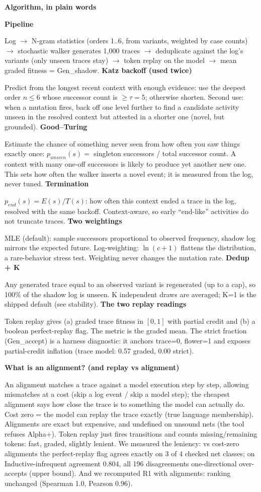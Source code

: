 \documentclass[10pt]{article}
\newcommand{\hdr}[1]{\vspace{5pt}\noindent\textcolor{hd}{\textbf{\large #1}}\par\vspace{2pt}}
\newcommand{\sub}[1]{\vspace{3pt}\noindent\textbf{#1}\par}
\begin{document}
\hdr{Algorithm, in plain words}
\sub{Pipeline}
Log $\to$ N-gram statistics (orders 1..6, from variants, weighted by case counts) $\to$ stochastic walker generates 1{,}000 traces $\to$ deduplicate against the log's variants (only unseen traces stay) $\to$ token replay on the model $\to$ mean graded fitness = Gen\_shadow.
\sub{Katz backoff (used twice)}
Predict from the longest recent context with enough evidence: use the deepest order $n\le6$ whose successor count is $\ge\tau{=}5$; otherwise shorten. Second use: when a mutation fires, back off one level further to find a candidate activity unseen in the resolved context but attested in a shorter one (novel, but grounded).
\sub{Good--Turing}
Estimate the chance of something never seen from how often you saw things exactly once: $p_{unseen}(s)=$ singleton successors / total successor count. A context with many one-off successors is likely to produce yet another new one. This sets how often the walker inserts a novel event; it is measured from the log, never tuned.
\sub{Termination}
$p_{end}(s)=E(s)/T(s)$: how often this context ended a trace in the log, resolved with the same backoff. Context-aware, so early ``end-like'' activities do not truncate traces.
\sub{Two weightings}
MLE (default): sample successors proportional to observed frequency, shadow log mirrors the expected future. Log-weighting: $\ln(c{+}1)$ flattens the distribution, a rare-behavior stress test. Weighting never changes the mutation rate.
\sub{Dedup + K}
Any generated trace equal to an observed variant is regenerated (up to a cap), so 100\% of the shadow log is unseen. K independent draws are averaged; K=1 is the shipped default (see stability).
\sub{The two replay readings}
Token replay gives (a) graded trace fitness in $[0,1]$ with partial credit and (b) a boolean perfect-replay flag. The metric is the graded mean. The strict fraction (Gen\_accept) is a harness diagnostic: it anchors trace=0, flower=1 and exposes partial-credit inflation (trace model: 0.57 graded, 0.00 strict).

\hdr{What is an alignment? (and replay vs alignment)}
An alignment matches a trace against a model execution step by step, allowing mismatches at a cost (skip a log event / skip a model step); the cheapest alignment says how close the trace is to something the model can actually do. Cost zero = the model can replay the trace exactly (true language membership). Alignments are exact but expensive, and undefined on unsound nets (the tool refuses Alpha+). Token replay just fires transitions and counts missing/remaining tokens: fast, graded, slightly lenient. We measured the leniency: vs cost-zero alignments the perfect-replay flag agrees exactly on 3 of 4 checked net classes; on Inductive-infrequent agreement 0.804, all 196 disagreements one-directional over-accepts (upper bound). And we recomputed R1 with alignments: ranking unchanged (Spearman 1.0, Pearson 0.96).
\end{document}
